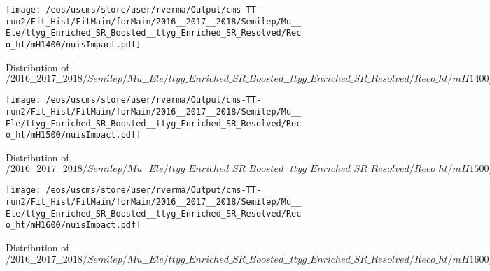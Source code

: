 \begin{figure}
\centering
\texttt{[image: /eos/uscms/store/user/rverma/Output/cms-TT-run2/Fit\_Hist/FitMain/forMain/2016\_\_2017\_\_2018/Semilep/Mu\_\_Ele/ttyg\_Enriched\_SR\_Boosted\_\_ttyg\_Enriched\_SR\_Resolved/Reco\_ht/mH1400/nuisImpact.pdf]}
\caption{Distribution of $/2016\_\_2017\_\_2018/Semilep/Mu\_\_Ele/ttyg\_Enriched\_SR\_Boosted\_\_ttyg\_Enriched\_SR\_Resolved/Reco\_ht/mH1400/nuisImpact.pdf$}
\end{figure}

\begin{figure}
\centering
\texttt{[image: /eos/uscms/store/user/rverma/Output/cms-TT-run2/Fit\_Hist/FitMain/forMain/2016\_\_2017\_\_2018/Semilep/Mu\_\_Ele/ttyg\_Enriched\_SR\_Boosted\_\_ttyg\_Enriched\_SR\_Resolved/Reco\_ht/mH1500/nuisImpact.pdf]}
\caption{Distribution of $/2016\_\_2017\_\_2018/Semilep/Mu\_\_Ele/ttyg\_Enriched\_SR\_Boosted\_\_ttyg\_Enriched\_SR\_Resolved/Reco\_ht/mH1500/nuisImpact.pdf$}
\end{figure}

\begin{figure}
\centering
\texttt{[image: /eos/uscms/store/user/rverma/Output/cms-TT-run2/Fit\_Hist/FitMain/forMain/2016\_\_2017\_\_2018/Semilep/Mu\_\_Ele/ttyg\_Enriched\_SR\_Boosted\_\_ttyg\_Enriched\_SR\_Resolved/Reco\_ht/mH1600/nuisImpact.pdf]}
\caption{Distribution of $/2016\_\_2017\_\_2018/Semilep/Mu\_\_Ele/ttyg\_Enriched\_SR\_Boosted\_\_ttyg\_Enriched\_SR\_Resolved/Reco\_ht/mH1600/nuisImpact.pdf$}
\end{figure}

